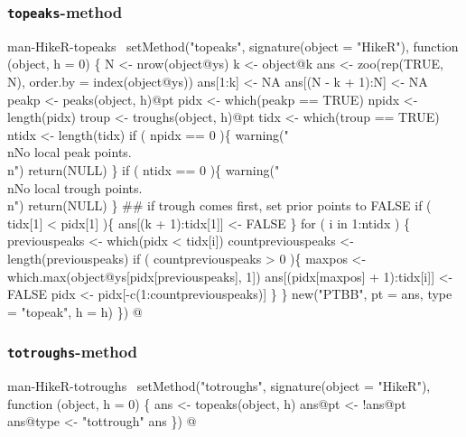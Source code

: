 \documentclass[a4paper]{article}
\begin{document}
\subsubsection{\texttt{topeaks}-method}

\nwenddocs{}\endmoddef
\LA{}man-HikeR-topeaks~{\nwtagstyle{}}\RA{}
setMethod("topeaks",
    signature(object = "HikeR"),
    function (object, h = 0) \{
        N <- nrow(object@ys)
        k <- object@k
        ans <- zoo(rep(TRUE, N), order.by = index(object@ys))
        ans[1:k] <- NA
        ans[(N - k + 1):N] <- NA
        peakp <- peaks(object, h)@pt
        pidx <- which(peakp == TRUE)
        npidx <- length(pidx)
        troup <- troughs(object, h)@pt
        tidx <- which(troup == TRUE)
        ntidx <- length(tidx)
        if ( npidx == 0 )\{
            warning("\\nNo local peak points.\\n")
            return(NULL)
        \}
        if ( ntidx == 0 )\{
            warning("\\nNo local trough points.\\n")
            return(NULL)
        \}
        ## if trough comes first, set prior points to FALSE
        if ( tidx[1] < pidx[1] )\{
            ans[(k + 1):tidx[1]] <- FALSE
        \}
        for ( i in 1:ntidx ) \{
            previouspeaks <- which(pidx < tidx[i])
            countpreviouspeaks <- length(previouspeaks)
            if ( countpreviouspeaks > 0 )\{
                maxpos <- which.max(object@ys[pidx[previouspeaks], 1])
                ans[(pidx[maxpos] + 1):tidx[i]] <- FALSE
                pidx <- pidx[-c(1:countpreviouspeaks)]
            \}
        \}
        new("PTBB", pt = ans, type = "topeak", h = h)
\})
\nwendcode{}@

\subsubsection{\texttt{totroughs}-method}

\nwenddocs{}\endmoddef
\LA{}man-HikeR-totroughs~{\nwtagstyle{}}\RA{}
setMethod("totroughs",
    signature(object = "HikeR"),
    function (object, h = 0) \{
        ans <- topeaks(object, h)
        ans@pt <- !ans@pt
        ans@type <- "tottrough"
        ans
\})
\nwendcode{}@
\end{document}
